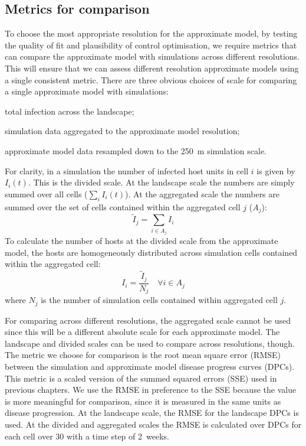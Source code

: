 \subsection{Metrics for comparison}

To choose the most appropriate resolution for the approximate model, by testing the quality of fit and plausibility of control optimisation, we require metrics that can compare the approximate model with simulations across different resolutions. This will ensure that we can assess different resolution approximate models using a single consistent metric. There are three obvious choices of scale for comparing a single approximate model with simulations:
\begin{description}
    \setlength{\itemsep}{3pt}%
    \setlength{\parskip}{3pt}%
    \setlength{\parsep}{3pt}%
    \item[Landscape scale:] total infection across the landscape;
    \item[Aggregated scale:] simulation data aggregated to the approximate model resolution;
    \item[Divided scale:] approximate model data resampled down to the \SI{250}{\meter} simulation scale.
\end{description}

For clarity, in a simulation the number of infected host units in cell $i$ is given by $I_i(t)$. This is the divided scale. At the landscape scale the numbers are simply summed over all cells ($\sum_iI_i(t)$). At the aggregated scale the numbers are summed over the set of cells contained within the aggregated cell $j$ ($A_j$):
\begin{equation}
    \tilde{I}_j = \sum_{i\in{}A_j}I_i
\end{equation}
To calculate the number of hosts at the divided scale from the approximate model, the hosts are homogeneously distributed across simulation cells contained within the aggregated cell:
\begin{equation}
    I_i = \frac{\tilde{I}_j}{N_j} \quad \forall i \in A_j
\end{equation}
where $N_j$ is the number of simulation cells contained within aggregated cell $j$.

For comparing across different resolutions, the aggregated scale cannot be used since this will be a different absolute scale for each approximate model. The landscape and divided scales can be used to compare across resolutions, though. The metric we choose for comparison is the root mean square error (RMSE) between the simulation and approximate model disease progress curves (DPCs). This metric is a scaled version of the summed squared errors (SSE) used in previous chapters. We use the RMSE in preference to the SSE because the value is more meaningful for comparison, since it is measured in the same units as disease progression. At the landscape scale, the RMSE for the landscape DPCs is used. At the divided and aggregated scales the RMSE is calculated over DPCs for each cell over \SI{30}{\years} with a time step of 2~weeks.

